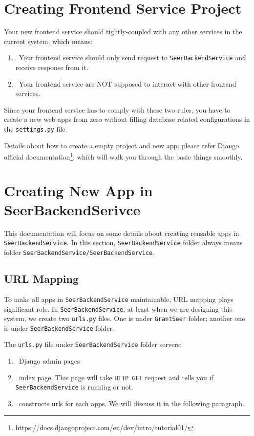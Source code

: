 \documentclass[12pt]{article}
\begin{document}
\section{Creating Frontend Service Project}
Your new frontend service should tightly-coupled with any other services in the current system, which means:
\begin{enumerate}
	\item\ Your frontend service should only send request to \texttt{SeerBackendService} and receive response from it.
	\item\ Your frontend service are NOT supposed to interact with other frontend services.
\end{enumerate}

Since your frontend service has to comply with these two rules, you have to create a new web apps from zero without filling database related configurations in the \texttt{settings.py} file.

Details about how to create a empty project and new app, please refer Django official documentation\footnote{https://docs.djangoproject.com/en/dev/intro/tutorial01/}, which will walk you through the basic things smoothly.

\section{Creating New App in SeerBackendSerivce}
This documentation will focus on some details about creating reusable apps in \texttt{SeerBackendService}. In this section, \texttt{SeerBackendService} folder always means folder \texttt{SeerBackendService/SeerBackendService}.

\subsection*{URL Mapping}
To make all apps in \texttt{SeerBackendService} maintainable, URL mapping plays significant role. In \texttt{SeerBackendService}, at least when we are designing this system, we create two \texttt{urls.py} files. One is under \texttt{GrantSeer} folder; another one is under \texttt{SeerBackendService} folder.

The \texttt{urls.py} file under \texttt{SeerBackendService} folder servers:
\begin{enumerate}
	\item\ Django admin pages
	\item\ index page. This page will take \texttt{HTTP GET} request and tells you if \texttt{SeerBackendService} is running or not.
	\item\ constructs urls for each apps. We will discuss it in the following paragraph.
\end{enumerate}
\end{document}
